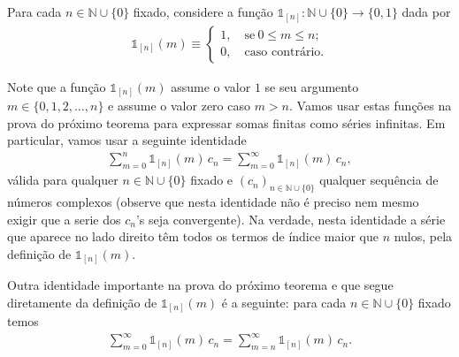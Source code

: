 

\bigskip

Para cada $n\in\mathbb{N}\cup\{0\}$ fixado, considere a função
$\mathds{1}_{[n]}:\mathbb{N}\cup\{0\}\to\{0,1\}$ dada por 
\begin{align}\label{eq-def-1mn}
\mathds{1}_{[n]}(m)
\equiv
\begin{cases}
1,\quad\text{se}\ 0\leqslant m\leqslant n;
\\[0.2cm]
0,\quad\text{caso contrário}.
\end{cases}
\end{align}

Note que a função $\mathds{1}_{[n]}(m)$ assume o valor $1$ se seu argumento  $m\in\{0,1,2,\ldots,n\}$ e assume o valor
zero caso $m>n$. 
Vamos usar estas funções na prova do próximo teorema para expressar somas finitas como 
séries infinitas. Em particular, vamos usar a seguinte identidade
\begin{align}\label{eq-aux1-indicadora-[m]}
\sum_{m=0}^n \mathds{1}_{[n]}(m)\, c_n = \sum_{m=0}^{\infty} \mathds{1}_{[n]}(m)\, c_n,
\end{align}
válida para qualquer $n\in\mathbb{N}\cup\{0\}$ fixado e $(c_n)_{n\in\mathbb{N}\cup\{0\}}$ qualquer sequência de números complexos
(observe que nesta identidade não é preciso nem mesmo 
exigir que a serie dos $c_n$'s seja convergente). 
Na verdade, 
nesta identidade a série que aparece no lado direito 
têm todos os termos de índice maior que $n$
nulos, pela definição de $\mathds{1}_{[n]}(m)$. 

Outra identidade importante na prova do próximo teorema 
e que segue diretamente da definição de $\mathds{1}_{[n]}(m)$ é a seguinte: 
para cada $n\in\mathbb{N}\cup\{0\}$ fixado temos
\begin{align}\label{eq-aux2-indicadora-[m]}
\sum_{m=0}^{\infty} 
\mathds{1}_{[n]}(m)\, c_n 
= 
\sum_{m=n}^{\infty} \mathds{1}_{[n]}(m)\, c_n.
\end{align}



